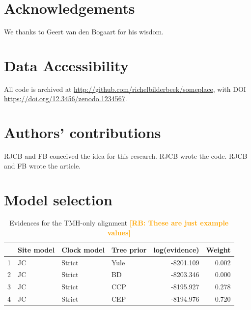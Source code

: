 \documentclass{article}
\newcommand{\richel}[1]{\textcolor{orange}{\textbf{[RB: #1]}}}
\begin{document}
\section{Acknowledgements}

We thanks to Geert van den Bogaart for his wisdom.

\section{Data Accessibility}

All code is archived at \url{http://github.com/richelbilderbeek/someplace},
with DOI \url{https://doi.org/12.3456/zenodo.1234567}.

\section{Authors' contributions}

RJCB and FB conceived the idea for this research. 
RJCB wrote the code.
RJCB and FB wrote the article.




\appendix

\section{Model selection}

\begin{table}[ht]
\centering
\begin{tabular}{rlllrr}
  \hline
 & Site model & Clock model & Tree prior & log(evidence) & Weight \\ 
  \hline
1 & JC & Strict & Yule & -8201.109 & 0.002 \\ 
  2 & JC & Strict & BD & -8203.346 & 0.000 \\ 
  3 & JC & Strict & CCP & -8195.927 & 0.278 \\ 
  4 & JC & Strict & CEP & -8194.976 & 0.720 \\ 
   \hline
\end{tabular}
\caption{
  Evidences for the TMH-only alignment
  \richel{These are just example values}
} 
\label{tab:evidences_tmh}
\end{table}
\end{document}
